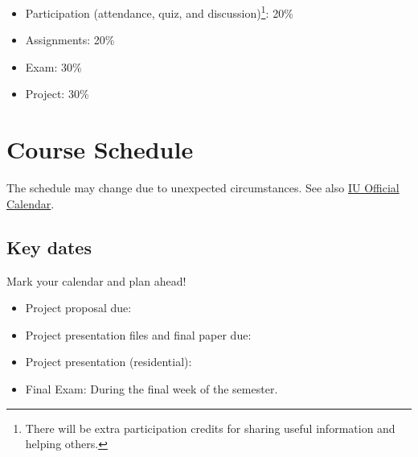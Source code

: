 \documentclass[11pt,article,oneside]{memoir} %
\begin{document}
\vspace{-10pt}
\begin{itemize}\itemsep=0pt

\item Participation (attendance, quiz, and discussion)\footnote{There will be extra participation credits for sharing useful information and helping others.}: 20\% 

\item Assignments: 20\%

\item Exam: 30\%

\item Project: 30\%

\end{itemize}
\clearpage
\section{Course Schedule} %

The schedule may change due to unexpected circumstances. See also \href{https://registrar.indiana.edu/official-calendar/index.shtml}{IU Official Calendar}. 

\subsection{Key dates}\label{sub:key_dates} %

Mark your calendar and plan ahead!

\vspace{-10pt}
\begin{itemize}\itemsep=0pt%
\item Project proposal due: %
\item Project presentation files and final paper due: %
\item Project presentation (residential): %
\item Final Exam: During the final week of the semester.
\end{itemize} %





\end{document}
